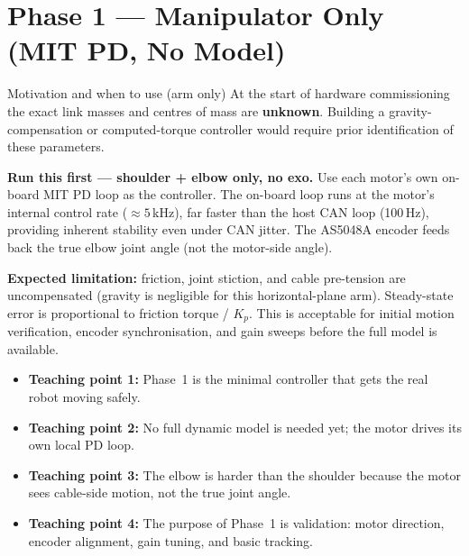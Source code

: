 \documentclass[11pt,a4paper]{article}
\begin{document}
\section{Phase 1 --- Manipulator Only (MIT PD, No Model)}
\label{sec:phase1}

\begin{phase1box}{Motivation and when to use (arm only)}
At the start of hardware commissioning the exact link masses and centres of
mass are \textbf{unknown}.  Building a gravity-compensation or computed-torque
controller would require prior identification of these parameters.

\medskip\noindent
\textbf{Run this first --- shoulder + elbow only, no exo.}
Use each motor's own on-board MIT PD loop as the controller.
The on-board loop runs at the motor's internal control rate (${\approx}5$\,kHz),
far faster than the host CAN loop (100\,Hz), providing inherent stability
even under CAN jitter.  The AS5048A encoder feeds back the true elbow
joint angle (not the motor-side angle).

\medskip\noindent
\textbf{Expected limitation:} friction, joint stiction, and cable pre-tension
are uncompensated (gravity is negligible for this horizontal-plane arm).
Steady-state error is proportional to friction torque / $K_p$.
This is acceptable for initial motion verification, encoder
synchronisation, and gain sweeps before the full model is available.
\end{phase1box}

\begin{lecturebox}
\begin{itemize}[leftmargin=1.5em]
  \item \textbf{Teaching point 1:} Phase~1 is the minimal controller that gets the real robot moving safely.
  \item \textbf{Teaching point 2:} No full dynamic model is needed yet; the motor drives its own local PD loop.
  \item \textbf{Teaching point 3:} The elbow is harder than the shoulder because the motor sees cable-side motion, not the true joint angle.
  \item \textbf{Teaching point 4:} The purpose of Phase~1 is validation: motor direction, encoder alignment, gain tuning, and basic tracking.
\end{itemize}
\end{lecturebox}
\end{document}
